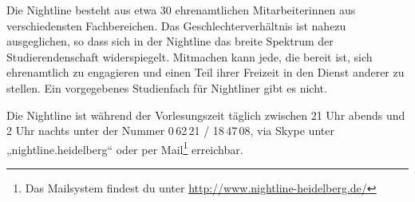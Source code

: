 Die Nightline besteht aus etwa 30 ehrenamtlichen Mitarbeiterinnen aus verschiedensten Fachbereichen. Das Geschlechterverhältnis ist nahezu ausgeglichen, so dass sich in der Nightline das breite Spektrum der Studierendenschaft widerspiegelt. Mitmachen kann jede, die bereit ist, sich ehrenamtlich zu engagieren und einen Teil ihrer Freizeit in den Dienst anderer zu stellen. Ein vorgegebenes Studienfach für Nightliner gibt es nicht.

Die Nightline ist während der Vorlesungszeit täglich zwischen 21 Uhr abends und 2 Uhr nachts unter der Nummer 0\,62\,21 / 18\,47\,08, via Skype unter „nightline.heidelberg“ oder per Mail\footnote{Das Mailsystem findest du unter \url{http://www.nightline-heidelberg.de/}} erreichbar.
